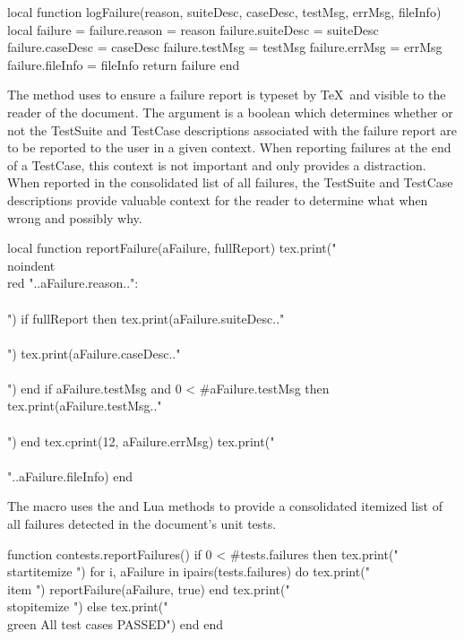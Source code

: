 \startLuaCode
local function logFailure(reason, suiteDesc, caseDesc,
                          testMsg, errMsg, fileInfo)
  local failure = {}
  failure.reason    = reason
  failure.suiteDesc = suiteDesc
  failure.caseDesc  = caseDesc
  failure.testMsg   = testMsg
  failure.errMsg    = errMsg
  failure.fileInfo  = fileInfo
  return failure
end
\stopLuaCode

The  method uses  to ensure a failure 
report is typeset by \TeX\ and visible to the reader of the document. The 
 argument is a boolean which determines whether or not 
the TestSuite and TestCase descriptions associated with the failure report 
are to be reported to the user in a given context. When reporting failures 
at the end of a TestCase, this context is not important and only provides 
a distraction. When reported in the consolidated list of all failures, the 
TestSuite and TestCase descriptions provide valuable context for the 
reader to determine what when wrong and possibly why. 

\startLuaCode
local function reportFailure(aFailure, fullReport)
  tex.print("\\noindent{\\red "..aFailure.reason.."}:\\\\")
  if fullReport then
    tex.print(aFailure.suiteDesc.."\\\\")
    tex.print(aFailure.caseDesc.."\\\\")
  end
  if aFailure.testMsg and 0 < #aFailure.testMsg then
    tex.print(aFailure.testMsg.."\\\\")
  end
  tex.cprint(12, aFailure.errMsg)
  tex.print("\\\\"..aFailure.fileInfo)
end
\stopLuaCode

The \type{\reportFailures} macro uses the  and 
 Lua methods to provide a consolidated itemized list 
of all failures detected in the document's unit tests. 

\startMkIVCode
\def\reportFailures{%
  \directlua{thirddata.contests.reportFailures()}
}
\stopMkIVCode

\startLuaCode
function contests.reportFailures()
  if 0 < #tests.failures then
    tex.print("\\startitemize ")
    for i, aFailure in ipairs(tests.failures) do
      tex.print("\\item ")
      reportFailure(aFailure, true)
    end
    tex.print("\\stopitemize ")
  else
    tex.print("{\\green All test cases PASSED}")
  end
end
\stopLuaCode


